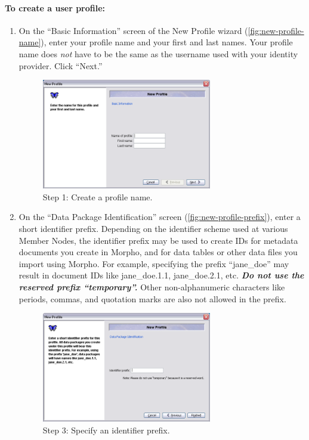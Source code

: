 \paragraph{To create a user profile:}
\begin{enumerate}
  \item On the ``Basic Information'' screen of the New Profile wizard
    (\autoref{fig:new-profile-name}), enter your profile name and your
    first and last names. Your profile name does \emph{not} have to be
    the same as the username used with your identity provider. Click ``Next.''

  \begin{figure}
    \centering
      \includegraphics[width=0.7\textwidth]{images/new-profile-name.png}
    \caption{Step 1: Create a profile name.}
    \label{fig:new-profile-name}
  \end{figure}

  \item On the ``Data Package Identification'' screen
    (\autoref{fig:new-profile-prefix}), enter a short identifier prefix.
    Depending on the identifier scheme used at various Member Nodes, 
    the identifier prefix may be used to create IDs for metadata
    documents you create in Morpho, and for data tables or other data
    files you import using Morpho. For example, specifying the prefix
    ``jane\_doe'' may result in document IDs like jane\_doe.1.1,
    jane\_doe.2.1, etc. \emph{\textbf{Do not use the reserved prefix
    ``temporary''.}} Other non-alphanumeric characters like periods, 
    commas, and quotation marks are also not allowed in the prefix.

  \begin{figure}
    \centering
      \includegraphics[width=0.7\textwidth]{images/new-profile-prefix.png}
    \caption{Step 3: Specify an identifier prefix.}
    \label{fig:new-profile-prefix}
  \end{figure}


\end{enumerate}
